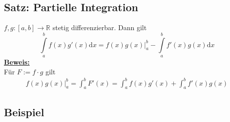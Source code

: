 \subsection{Satz: Partielle Integration} %
\label{sub:satz_partielle_integration}
$f,g : [a,b] \to \mathds{R}$ stetig differenzierbar. Dann gilt 
\[
	\int\limits_{a}^{b} \! f(x) g'(x)  \mathrm{d}x = f(x) g(x) \Big|_a^b - \int\limits_{a}^{b} \! f'(x) g(x)  \mathrm{d}x 
\]
\underline{\textbf{Beweis:}} \\
Für $F:= f \cdot g$ gilt 
\begin{align*}
	f(x) g(x)\Big|_a^b = \int_{a} ^{b} \! F'(x) = \int_{a} ^{b} \! f(x) g'(x) +  \int_{a} ^{b} \! f'(x) g(x) 
\end{align*}

\subsection{Beispiel} %
\label{sub:beispiel}
